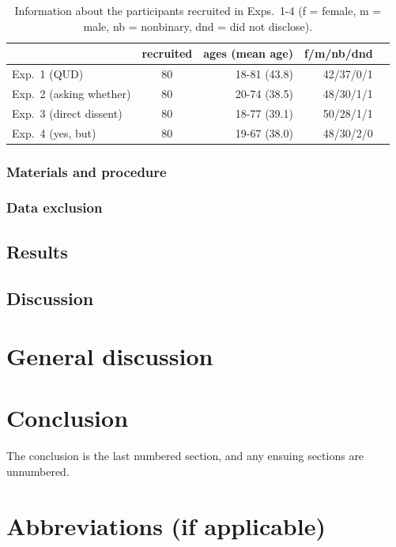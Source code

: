 \documentclass[times,linguex,xcolor]{glossa}
\begin{document}
  \begin{table}[h!]
  \centering
  \begin{tabular}{l | c | r r r }
              & recruited & ages (mean age) & f/m/nb/dnd \\ \hline
  Exp.~1 (QUD) & 80 & 18-81 (43.8) & 42/37/0/1  \\
  Exp.~2 (asking whether) & 80 & 20-74 (38.5)  & 48/30/1/1  \\
  Exp.~3 (direct dissent) & 80 & 18-77 (39.1) & 50/28/1/1  \\
  Exp.~4 (yes, but) &80 & 19-67 (38.0)  & 48/30/2/0 &  \\
  \hline
  \end{tabular}

  \caption{Information about the participants recruited in Exps.~1-4 (f = female, m = male, nb = nonbinary, dnd = did not disclose).}\label{t:recruited}
  \end{table}

\subsubsection{Materials and procedure}

\subsubsection{Data exclusion}

\subsection{Results}

\subsection{Discussion}

\section{General discussion}



\section{Conclusion}

The conclusion is the last numbered section, and any ensuing sections are unnumbered.

\pagebreak
\section*{Abbreviations (if applicable)}\label{abbrev}
\end{document}
